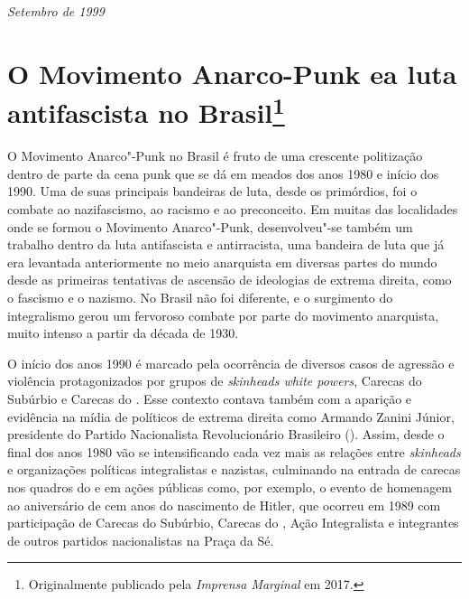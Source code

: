 
\hfill{}\emph{Setembro de 1999}


\chapter[O Movimento Anarco-Punk e a luta antifascista no Brasil]{O Movimento Anarco-Punk e\break a luta antifascista no Brasil\footnote[*]{Originalmente publicado pela \emph{Imprensa Marginal} em 2017.}}

O Movimento Anarco"-Punk no Brasil é fruto de uma crescente politização dentro de parte da cena punk que se dá em meados dos anos 1980 e início dos 1990. Uma de suas principais bandeiras de luta, desde os primórdios, foi o combate ao nazifascismo, ao racismo e ao preconceito. Em muitas das localidades onde se formou o Movimento Anarco"-Punk, desenvolveu"-se também um trabalho dentro da luta antifascista e antirracista, uma bandeira de luta que já era levantada anteriormente no meio anarquista em diversas partes do mundo desde as primeiras tentativas de ascensão de ideologias de extrema direita, como o fascismo e o nazismo. No Brasil não foi diferente, e o surgimento do integralismo gerou um fervoroso combate por parte do movimento anarquista, muito intenso a partir da década de 1930.

O início dos anos 1990 é marcado pela ocorrência de diversos casos de agressão e violência protagonizados por grupos de \emph{skinheads white powers}, Carecas do Subúrbio e Carecas do . Esse contexto contava também com a aparição e evidência na mídia de políticos de extrema direita como Armando Zanini Júnior, presidente do Partido Nacionalista Revolucionário Brasileiro (). Assim, desde o final dos anos 1980 vão se intensificando cada vez mais as relações entre \emph{skinheads} e organizações políticas integralistas e nazistas, culminando na entrada de carecas nos quadros do  e em ações públicas como, por exemplo, o evento de homenagem ao aniversário de cem anos do nascimento de Hitler, que ocorreu em 1989 com participação de Carecas do Subúrbio, Carecas do , Ação Integralista e integrantes de outros partidos nacionalistas na Praça da Sé.

